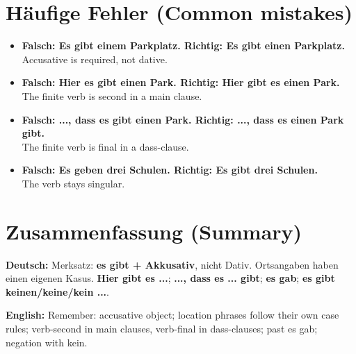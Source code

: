 \documentclass[a4paper,11pt]{article}
\newcommand{\GermanText}[1]{\textbf{Deutsch: }#1\par}
\newcommand{\EnglishText}[1]{{\small\color{SoftGray}\textbf{English: }#1\par}}
\newcommand{\ExampleItem}[2]{\item \textbf{#1}\\{\small\color{SoftGray}#2}}
\begin{document}
\section{Häufige Fehler (Common mistakes)}
\begin{exbox}\begin{itemize}
\ExampleItem{Falsch: Es gibt einem Parkplatz. Richtig: Es gibt einen Parkplatz.}{Accusative is required, not dative.}
\ExampleItem{Falsch: Hier es gibt einen Park. Richtig: Hier gibt es einen Park.}{The finite verb is second in a main clause.}
\ExampleItem{Falsch: ..., dass es gibt einen Park. Richtig: ..., dass es einen Park gibt.}{The finite verb is final in a dass-clause.}
\ExampleItem{Falsch: Es geben drei Schulen. Richtig: Es gibt drei Schulen.}{The verb stays singular.}
\end{itemize}\end{exbox}
\section{Zusammenfassung (Summary)}
\GermanText{Merksatz: \textbf{es gibt + Akkusativ}, nicht Dativ. Ortsangaben haben einen eigenen Kasus. \textbf{Hier gibt es ...}; \textbf{..., dass es ... gibt}; \textbf{es gab}; \textbf{es gibt keinen/keine/kein ...}.}
\EnglishText{Remember: accusative object; location phrases follow their own case rules; verb-second in main clauses, verb-final in dass-clauses; past es gab; negation with kein.}
\end{document}
